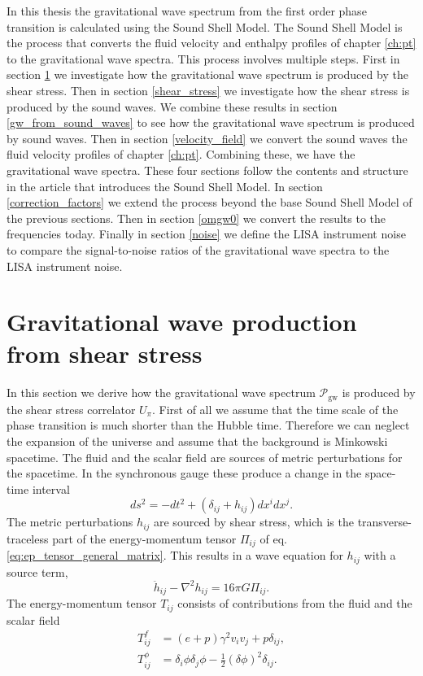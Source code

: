 In this thesis the gravitational wave spectrum from the first order phase transition is calculated using the Sound Shell Model.
The Sound Shell Model is the process that converts the fluid velocity and enthalpy profiles of chapter \ref{ch:pt} to the gravitational wave spectra.
This process involves multiple steps.
First in section \ref{gw_production} we investigate how the gravitational wave spectrum is produced by the shear stress.
Then in section \ref{shear_stress} we investigate how the shear stress is produced by the sound waves.
We combine these results in section \ref{gw_from_sound_waves} to see how the gravitational wave spectrum is produced by sound waves.
Then in section \ref{velocity_field} we convert the sound waves the fluid velocity profiles of chapter \ref{ch:pt}.
Combining these, we have the gravitational wave spectra.
These four sections follow the contents and structure in the article \cite{hindmarsh_gw_pt_2019} that introduces the Sound Shell Model.
In section \ref{correction_factors} we extend the process beyond the base Sound Shell Model of the previous sections.
Then in section \ref{omgw0} we convert the results to the frequencies today.
Finally in section \ref{noise} we define the LISA instrument noise to compare the signal-to-noise ratios of the gravitational wave spectra to the LISA instrument noise.


\section{Gravitational wave production from shear stress}
\label{gw_production}
In this section we derive how the gravitational wave spectrum $\mathcal{P}_\text{gw}$ is produced by the shear stress correlator $U_\pi$.
First of all we assume that the time scale of the phase transition is much shorter than the Hubble time.
Therefore we can neglect the expansion of the universe and assume that the background is Minkowski spacetime.
The fluid and the scalar field are sources of metric perturbations for the spacetime.
In the synchronous gauge these produce a change in the space-time interval
\cite[p. 7]{hindmarsh_gw_pt_2019}
\begin{equation}
ds^2 = -dt^2 + (\delta_{ij} + h_{ij}) dx^i dx^j.
\end{equation}
The metric perturbations $h_{ij}$ are sourced by shear stress,
which is the transverse-traceless part of the energy-momentum tensor $\Pi_{ij}$ of eq. \eqref{eq:ep_tensor_general_matrix}.
This results in a wave equation for $h_{ij}$ with a source term,
\cites[eq. 3.1]{hindmarsh_gw_pt_2019}[eq. 1.24]{maggiore_gw_2008}
\begin{equation}
\ddot{h}_{ij} - \nabla^2 h_{ij} = 16 \pi G \Pi_{ij}.
\end{equation}
The energy-momentum tensor $T_{ij}$ consists of contributions from the fluid and the scalar field \cite[p. 7]{hindmarsh_gw_pt_2019}
\begin{align}
T^f_{ij}    &= (e+p) \gamma^2 v_i v_j + p \delta_{ij}, \\
T^\phi_{ij} &= \delta_i \phi \delta_j \phi - \frac{1}{2}(\delta \phi)^2 \delta_{ij}.
\end{align}

